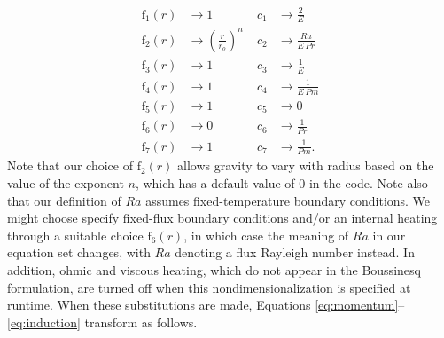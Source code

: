 \documentclass[10pt, letterpaper]{article}
\newcommand{\ff}{\mathrm{f}}
\begin{document}
\begin{align*}
\ff_1(r) &\rightarrow 1\; &c_1 &\rightarrow \frac{2}{E} \\
\ff_2(r) &\rightarrow \left(\frac{r}{r_o}\right)^n \; &c_2 &\rightarrow \frac{Ra}{E\,Pr} \\
\ff_3(r) &\rightarrow 1\; &c_3 &\rightarrow \frac{1}{E}\\
\ff_4(r) &\rightarrow 1\; &c_4 &\rightarrow \frac{1}{E\,Pm} \\
\ff_5(r) &\rightarrow 1\; &c_5 &\rightarrow 0 \\
\ff_6(r) &\rightarrow 0\; &c_6 &\rightarrow \frac{1}{Pr}  \\
\ff_7(r) &\rightarrow 1\; &c_7 &\rightarrow \frac{1}{Pm}.
\end{align*}
Note that our choice of $\ff_2(r)$ allows gravity to vary with radius based on the value of the exponent $n$, which has a default value of 0 in the code.  Note also that our definition of $Ra$ assumes fixed-temperature boundary conditions.  We might choose specify fixed-flux boundary conditions and/or an internal heating through a suitable choice $\ff_6(r)$, in which case the meaning of $Ra$ in our equation set changes, with $Ra$ denoting a flux Rayleigh number instead.  In addition, ohmic and viscous heating, which do not appear in the Boussinesq formulation, are turned off when this nondimensionalization is specified at runtime.   When these substitutions are made, Equations \ref{eq:momentum}--\ref{eq:induction} transform as follows.
\end{document}
